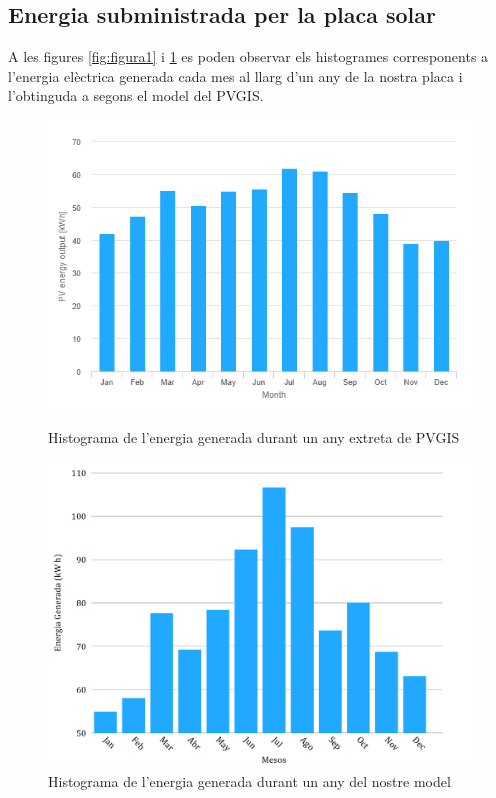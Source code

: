 \documentclass[10pt, twoside, a4paper]{article}
\begin{document}
\subsection{Energia subministrada per la placa solar}
A les figures \ref{fig:figura1} i \ref{fig:figura2} es poden observar els histogrames corresponents a l'energia elèctrica generada cada mes al llarg d'un any de la nostra placa i l'obtinguda a segons el model del PVGIS. 

\begin{figure}[!ht]
    \centering
    \begin{minipage}{0.48\linewidth} 
        \centering
        \includegraphics[width=\linewidth]{Histograma_PVGIS.png}
        \caption{Histograma de l'energia generada durant un any extreta de PVGIS}
        \label{fig:figura1}
    \end{minipage}\hfill 
    \begin{minipage}{0.48\linewidth} 
        \centering
        \includegraphics[width=\linewidth]{../Mov_sol/histograma.png}
        \caption{Histograma de l'energia generada durant un any del nostre model}
        \label{fig:figura2}
    \end{minipage}
\end{figure}
\end{document}
